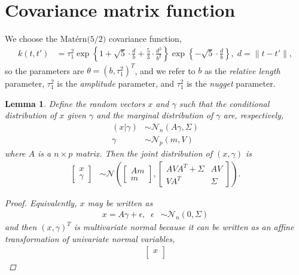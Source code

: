 \documentclass{article}
\newtheorem{lemma}[theorem]{Lemma}
\newcommand{\pN}{\mathcal{N}}
\newcommand{\1}{\mathbf{1}}
\newcommand{\0}{\mathbf{0}}
\begin{document}
\section{Covariance matrix function}
%
%
We choose the $\text{Mat\'{e}rn(5/2)}$ covariance function,
%
%
\begin{align}
	k(t, t') &= \tau_1^2 \exp\left\{ 1 + \sqrt{5} \cdot \frac{d}{b} + \frac{5}{3} \cdot \frac{d^2}{b^2} \right\} \exp \left\{ -\sqrt{5} \cdot \frac{d}{b} \right \} , \; d = \|t - t' \|,
\end{align}
%
%
so the parameters are $\theta = (b, \tau_1^2)^T$, and we refer to $b$ as the \emph{relative length} parameter, $\tau_1^2$ is the \emph{amplitude} parameter, and $\tau_1^2$ is the \emph{nugget} parameter.
%
%
%
%
\begin{lemma}\label{lem:joint}
	Define the random vectors $x$ and $\gamma$ such that the conditional distribution of $x$ given $\gamma$ and the marginal distribution of $\gamma$ are, respectively,
	\begin{align*}
		(x | \gamma) &\sim \pN_n(A\gamma, \Sigma) \\
		\gamma &\sim \pN_p(m, V)
	\end{align*}
	where $A$ is a $n \times p$ matrix. Then the joint distribution of $(x, \gamma)$ is 
	\begin{align}
		\begin{bmatrix}
			x \\
			\gamma
		\end{bmatrix} &\sim \pN \left( \begin{bmatrix}
			Am \\
			m
		\end{bmatrix}, \begin{bmatrix}
			AVA^T + \Sigma & AV \\
			VA^T & \Sigma
		\end{bmatrix} \right). \label{eqn:lemmaresult}
	\end{align}
	\begin{proof}
		Equivalently, $x$ may be written as  
		\begin{align*}
			x = A\gamma + \epsilon,\;\; \epsilon &\sim \pN_n(0, \Sigma) 
		\end{align*}
		and then $(x, \gamma)^T$ is multivariate normal because it can be written as an affine transformation of univariate normal variables,
		\begin{align*}
			\begin{bmatrix}
				x \\

\end{bmatrix}
\end{align*}
\end{proof}
\end{lemma}
\end{document}
